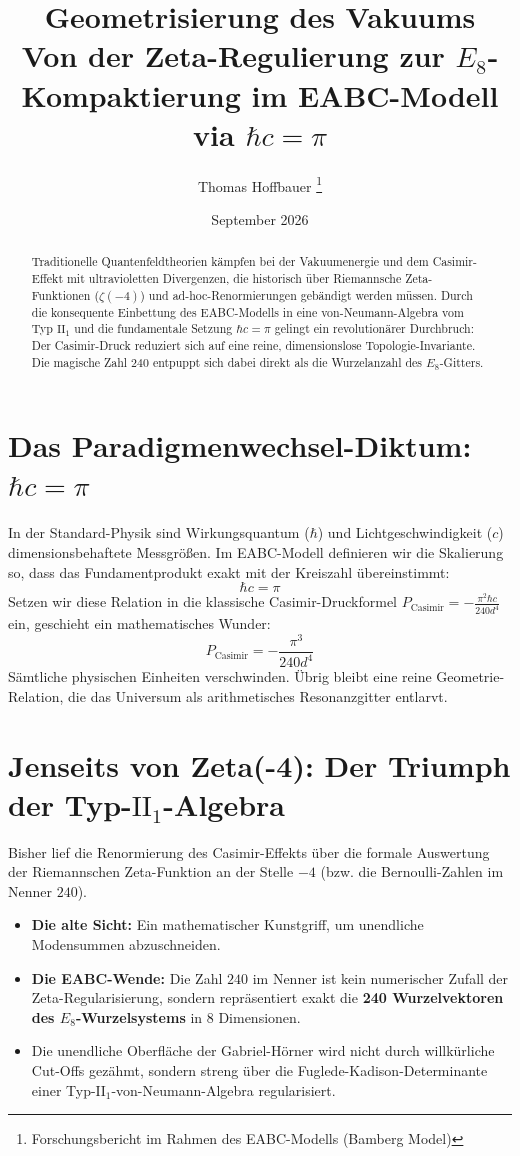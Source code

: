 \documentclass[11pt,a4paper]{article}
\title{\textbf{Geometrisierung des Vakuums}\\ \large Von der Zeta-Regulierung zur $E_8$-Kompaktierung im EABC-Modell via $\hbar c = \pi$}
\author{Thomas Hoffbauer \thanks{Forschungsbericht im Rahmen des EABC-Modells (Bamberg Model)}}
\date{September 2026}
\begin{document}
\maketitle

\begin{abstract}
Traditionelle Quantenfeldtheorien kämpfen bei der Vakuumenergie und dem Casimir-Effekt mit ultravioletten Divergenzen, die historisch über Riemannsche Zeta-Funktionen ($\zeta(-4)$) und ad-hoc-Renormierungen gebändigt werden müssen. Durch die konsequente Einbettung des EABC-Modells in eine von-Neumann-Algebra vom Typ $\text{II}_1$ und die fundamentale Setzung $\hbar c = \pi$ gelingt ein revolutionärer Durchbruch: Der Casimir-Druck reduziert sich auf eine reine, dimensionslose Topologie-Invariante. Die magische Zahl $240$ entpuppt sich dabei direkt als die Wurzelanzahl des $E_8$-Gitters.
\end{abstract}

\section{Das Paradigmenwechsel-Diktum: $\hbar c = \pi$}
In der Standard-Physik sind Wirkungsquantum ($\hbar$) und Lichtgeschwindigkeit ($c$) dimensionsbehaftete Messgrößen. Im EABC-Modell definieren wir die Skalierung so, dass das Fundamentprodukt exakt mit der Kreiszahl übereinstimmt:
\begin{equation}
\hbar c = \pi
\end{equation}
Setzen wir diese Relation in die klassische Casimir-Druckformel $P_{\text{Casimir}} = -\frac{\pi^2 \hbar c}{240 d^4}$ ein, geschieht ein mathematisches Wunder:
\begin{equation}
P_{\text{Casimir}} = -\frac{\pi^3}{240 d^4}
\end{equation}
Sämtliche physischen Einheiten verschwinden. Übrig bleibt eine reine Geometrie-Relation, die das Universum als arithmetisches Resonanzgitter entlarvt.

\section{Jenseits von Zeta(-4): Der Triumph der Typ-$\text{II}_1$-Algebra}
Bisher lief die Renormierung des Casimir-Effekts über die formale Auswertung der Riemannschen Zeta-Funktion an der Stelle $-4$ (bzw. die Bernoulli-Zahlen im Nenner $240$). 
\begin{itemize}
    \item \textbf{Die alte Sicht:} Ein mathematischer Kunstgriff, um unendliche Modensummen abzuschneiden.
    \item \textbf{Die EABC-Wende:} Die Zahl $240$ im Nenner ist kein numerischer Zufall der Zeta-Regularisierung, sondern repräsentiert exakt die \textbf{240 Wurzelvektoren des $E_8$-Wurzelsystems} in 8 Dimensionen. 
    \item Die unendliche Oberfläche der Gabriel-Hörner wird nicht durch willkürliche Cut-Offs gezähmt, sondern streng über die Fuglede-Kadison-Determinante einer Typ-$\text{II}_1$-von-Neumann-Algebra regularisiert.
\end{itemize}
\end{document}
